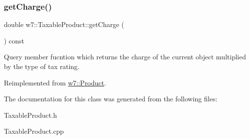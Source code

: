 \subsubsection{\texorpdfstring{get\+Charge()}{getCharge()}}
{\footnotesize\ttfamily double w7\+::\+Taxable\+Product\+::get\+Charge (\begin{DoxyParamCaption}{ }\end{DoxyParamCaption}) const\hspace{0.3cm}{\ttfamily [virtual]}}

Query member fucntion which returns the charge of the current object multiplied by the type of tax rating. 

Reimplemented from \mbox{\hyperlink{classw7_1_1Product_a6d73613659451d1492541ef3d0d016b7}{w7\+::\+Product}}.



The documentation for this class was generated from the following files\+:\begin{DoxyCompactItemize}
\item 
Taxable\+Product.\+h\item 
Taxable\+Product.\+cpp\end{DoxyCompactItemize}

